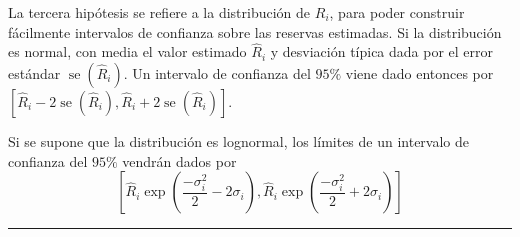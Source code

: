 \begin{f}
%

		

La tercera hipótesis se refiere a la distribución de \(R_{i}\), para poder construir fácilmente intervalos de confianza sobre las reservas estimadas. Si la distribución es normal, con media el valor estimado \(\hat{R}_{i}\) y desviación típica dada por el error estándar \(\operatorname{se}\left(\hat{R}_{i}\right)\). Un intervalo de confianza del \(95 \%\) viene dado entonces por \(\left[\hat{R}_{i}-2 \operatorname{se}\left(\hat{R}_{i}\right), \hat{R}_{i}+2 \operatorname{se}\left(\hat{R}_{i}\right)\right]\).

Si se supone que la distribución es lognormal, los límites de un intervalo de confianza del \(95 \%\) vendrán dados por
\[
\left[\hat{R}_{i} \exp \left(\frac{-\sigma_{i}^{2}}{2}-2 \sigma_{i}\right), \hat{R}_{i} \exp \left(\frac{-\sigma_{i}^{2}}{2}+2 \sigma_{i}\right)\right]
\]
		
\end{f}
\hrule

